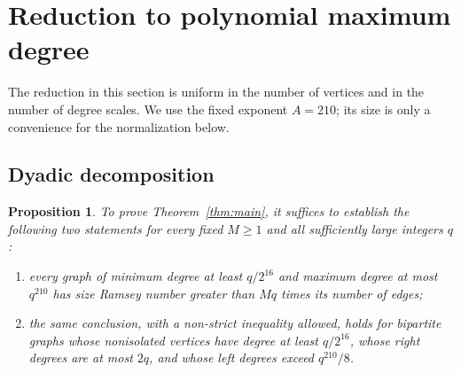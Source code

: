 \documentclass[11pt]{amsart}
\newtheorem{proposition}[theorem]{Proposition}
\theoremstyle{definition}
\theoremstyle{remark}
\numberwithin{equation}{section}
\begin{document}
\section{Reduction to polynomial maximum degree}\label{sec:reductions}

The reduction in this section is uniform in the number of vertices and in
the number of degree scales. We use the fixed exponent $A=210$; its size
is only a convenience for the normalization below.

\subsection{Dyadic decomposition}

\begin{proposition}\label{prop:two-classes}
To prove Theorem~\ref{thm:main}, it suffices to establish the following
two statements for every fixed $M\ge1$ and all sufficiently large integers
$q$:
\begin{enumerate}
\item every graph of minimum degree at least $q/2^{16}$ and maximum
degree at most $q^{210}$ has size Ramsey number greater than $ Mq$ times
its number of edges;
\item the same conclusion, with a non-strict inequality allowed, holds
for bipartite graphs whose nonisolated vertices have degree at least
$q/2^{16}$, whose right degrees are at most $2q$, and whose left degrees
exceed $q^{210}/8$.
\end{enumerate}
\end{proposition}
\end{document}
